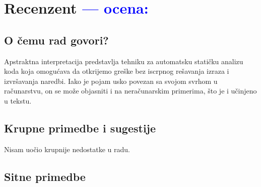 \documentclass[a4paper]{report}
\newcommand{\odgovor}[1]{\textcolor{blue}{#1}}
\begin{document}
\chapter{Recenzent \odgovor{--- ocena:} }


\section{O čemu rad govori?}

Apstraktna interpretacija predstavlja tehniku za automatsku statičku analizu koda koja omogućava da otkrijemo greške bez iscrpnog rešavanja izraza i izvršavanja naredbi. Iako je pojam usko povezan sa svojom svrhom u računarstvu, on se može objasniti i na neračunarskim primerima, što je i učinjeno u tekstu.
\section{Krupne primedbe i sugestije}
Nisam uočio krupnije nedostatke u radu.
\section{Sitne primedbe}
\end{document}
